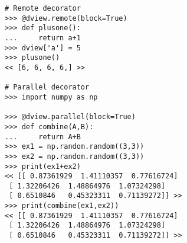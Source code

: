 \begin{lstlisting}
# Remote decorator
>>> @dview.remote(block=True)
>>> def plusone():
...     return a+1
>>> dview['a'] = 5
>>> plusone()
<< [6, 6, 6, 6,] >>

# Parallel decorator
>>> import numpy as np

>>> @dview.parallel(block=True)
>>> def combine(A,B):
...     return A+B
>>> ex1 = np.random.random((3,3))
>>> ex2 = np.random.random((3,3))
>>> print(ex1+ex2)
<< [[ 0.87361929  1.41110357  0.77616724]
 [ 1.32206426  1.48864976  1.07324298]
 [ 0.6510846   0.45323311  0.71139272]] >>
>>> print(combine(ex1,ex2))
<< [[ 0.87361929  1.41110357  0.77616724]
 [ 1.32206426  1.48864976  1.07324298]
 [ 0.6510846   0.45323311  0.71139272]] >>
 \end{lstlisting}

